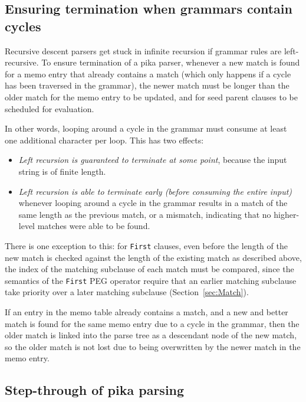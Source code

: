 \documentclass[manuscript,screen]{acmart}
\begin{document}
\subsection{\label{sec:leftRecursionTermination}Ensuring termination when grammars contain cycles}

Recursive descent parsers get stuck in infinite recursion if grammar rules are left-recursive. To ensure termination of a pika parser, whenever a new match is found for a memo entry that already contains a match (which only happens if a cycle has been traversed in the grammar), the newer match must be longer than the older match for the memo entry to be updated, and for seed parent clauses to be scheduled for evaluation.

In other words, looping around a cycle in the grammar must consume at least one additional character per loop. This has two effects:

\begin{itemize}
    \item \emph{Left recursion is guaranteed to terminate at some point}, because the input string is of finite length.
    \item \emph{Left recursion is able to terminate early (before consuming the entire input)} whenever looping around a cycle in the grammar results in a match of the same length as the previous match, or a mismatch, indicating that no higher-level matches were able to be found.
\end{itemize}

There is one exception to this: for \texttt{First} clauses, even before the length of the new match is checked against the length of the existing match as described above, the index of the matching subclause of each match must be compared, since the semantics of the \texttt{First} PEG operator require that an earlier matching subclause take priority over a later matching subclause (Section~\ref{sec:Match}).

If an entry in the memo table already contains a match, and a new and better match is found for the same memo entry due to a cycle in the grammar, then the older match is linked into the parse tree as a descendant node of the new match, so the older match is not lost due to being overwritten by the newer match in the memo entry.

\subsection{Step-through of pika parsing}
\end{document}
